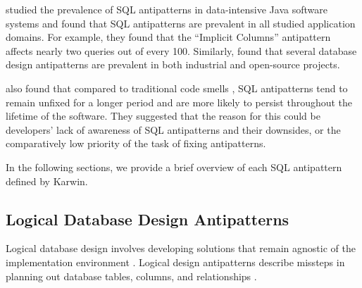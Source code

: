  studied the prevalence of SQL antipatterns in data-intensive Java software systems and found that SQL antipatterns are prevalent in all studied application domains. For example, they found that the “Implicit Columns” antipattern affects nearly two queries out of every \num{100}. Similarly,  found that several database design antipatterns are prevalent in both industrial and open-source projects.

 also found that compared to traditional code smells , SQL antipatterns tend to remain unfixed for a longer period and are more likely to persist throughout the lifetime of the software. They suggested that the reason for this could be developers' lack of awareness of SQL antipatterns and their downsides, or the comparatively low priority of the task of fixing antipatterns.

In the following sections, we provide a brief overview of each SQL antipattern defined by Karwin.

\subsection{Logical Database Design Antipatterns}\label{sec:logicalAntipatterns}

Logical database design involves developing solutions that remain agnostic of the implementation environment . Logical design antipatterns describe missteps in planning out database tables, columns, and relationships .

